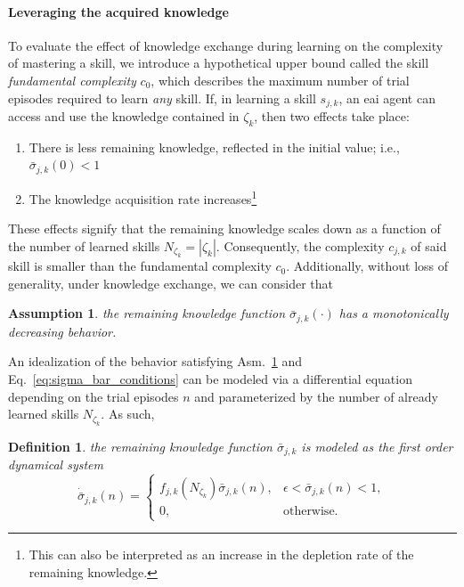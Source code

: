 \documentclass[12pt]{article}
\renewcommand{\emph}[1]{\textit{#1}}
\newtheorem{assumption}{Assumption}
\newtheorem{definition}{Definition}
\begin{document}
\paragraph*{Leveraging the acquired knowledge}
To evaluate the effect of knowledge exchange during learning on the complexity of mastering a skill, we introduce a hypothetical upper bound called the skill \textit{fundamental complexity} $c_0$, which describes the maximum number of trial episodes required to learn \emph{any} skill. If, in learning a skill $ s_{j,k} $, an \ac{eai} agent can access and use the knowledge contained in $\mathcal{\zeta}_k$, then two effects take place:
\begin{enumerate}
	\item There is less remaining knowledge, reflected in the initial value; i.e., $\bar{\sigma}_{j,k}(0) < 1$
	\item The knowledge acquisition rate increases\footnote{This can also be interpreted as an increase in the depletion rate of the remaining knowledge.}
\end{enumerate}
These effects signify that the remaining knowledge scales down as a function of the number of learned skills $N_{\zeta_k}=|\mathcal{\zeta}_k|$. Consequently, the complexity $c_{j,k}$ of said skill is smaller than the fundamental complexity $c_0$. Additionally, without loss of generality, under knowledge exchange, we can consider that
\begin{tcolorbox}
	\begin{assumption}\label{assumption:exponential_decrease} the remaining knowledge function $\bar{\sigma}_{j,k}(\cdot)$ has a monotonically decreasing behavior.
	\end{assumption}
\end{tcolorbox} 
\noindent An idealization of the behavior satisfying Asm.~\ref{assumption:exponential_decrease} and Eq.~\eqref{eq:sigma_bar_conditions} can be modeled via a differential equation depending on the trial episodes $n$ and parameterized by the number of already learned skills $N_{\zeta_k}$. As such,
\begin{definition}\label{assumption:ode_model} the remaining knowledge function $\bar{\sigma}_{j,k}$ is modeled as the first order dynamical system
	\begin{equation}\label{eq:simple_knowledge_dynamics}
		\dot{\bar{\sigma}}_{j,k}\left(n\right)=\begin{cases}
			f_{j,k} \left(N_{\zeta_k} \right) \bar{\sigma}_{j,k}\left(n\right), & \epsilon < \bar{\sigma}_{j,k}\left(n\right) < 1, \\
			0, & \text{otherwise}.
		\end{cases}
	\end{equation}	
\end{definition}
\end{document}
